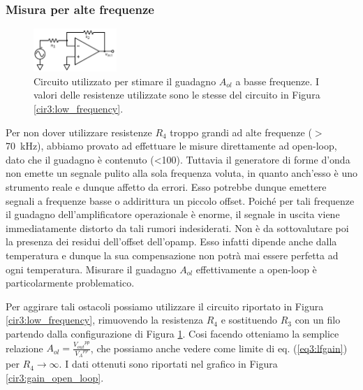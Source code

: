 \subsubsection*{Misura per alte frequenze}

\begin{figure}
  \begin{center}
    \includegraphics[width=0.28\textwidth]{../E03/latex/HF_ol.pdf}
  \end{center}
  \caption{Circuito utilizzato per stimare il guadagno $A_{ol}$ a basse frequenze. I valori delle resistenze utilizzate sono le stesse del circuito in Figura \ref{cir3:low_frequency}.}
  \label{cir3:high_frequency}
\end{figure}

Per non dover utilizzare resistenze $R_4$ troppo grandi ad alte frequenze ($>$ \SI{70}{\kilo\hertz}), abbiamo provato ad effettuare le misure direttamente ad open-loop, dato che il guadagno è contenuto (\num{<100}).
Tuttavia il generatore di forme d'onda non emette un segnale pulito alla sola frequenza voluta, in quanto anch'esso è uno strumento reale e dunque affetto da errori.
Esso potrebbe dunque emettere segnali a frequenze basse o addirittura un piccolo offset.
Poiché per tali frequenze il guadagno dell'amplificatore operazionale è enorme, il segnale in uscita viene immediatamente distorto da tali rumori indesiderati.
Non è da sottovalutare poi la presenza dei residui dell'offset dell'opamp.
Esso infatti dipende anche dalla temperatura e dunque la sua compensazione non potrà mai essere perfetta ad ogni temperatura.
Misurare il guadagno $A_{ol}$ effettivamente a open-loop è particolarmente problematico.

Per aggirare tali ostacoli possiamo utilizzare il circuito riportato in Figura \ref{cir3:low_frequency}, rimuovendo la resistenza $R_4$ e sostituendo $R_3$ con un filo partendo dalla configurazione di Figura \ref{cir3:high_frequency}.
Cosi facendo otteniamo la semplice relazione $A_{ol}=\frac{{V_{out}}^{pp}}{{V_A}^{pp}}$, che possiamo anche vedere come limite di eq. (\ref{eq3:lfgain}) per $R_4 \rightarrow \infty$.
I dati ottenuti sono riportati nel grafico in Figura \ref{cir3:gain_open_loop}.

